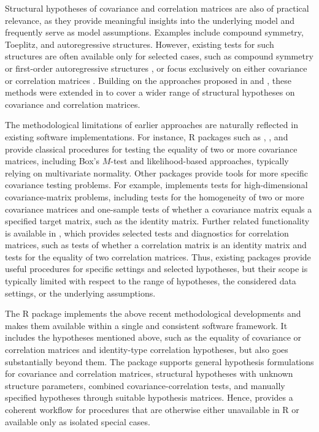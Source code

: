 Structural hypotheses of covariance and correlation matrices are also of
practical relevance, as they provide meaningful insights into the underlying
model and frequently serve as model assumptions. Examples include compound
symmetry, Toeplitz, and autoregressive structures. However, existing tests for
such structures are often available only for selected cases, such as compound
symmetry \citep{winer1991, votaw1948} or first-order
autoregressive structures \citep{mckeown1996}, or focus exclusively on
either covariance or correlation matrices \citep{steiger1980}. Building on
the approaches proposed in \citet{sattler2022} and \citet{sattler2023},
these methods were extended in \citet{sattler2024a} to cover a wider range of
structural hypotheses on covariance and correlation matrices.

The methodological limitations of earlier approaches are naturally reflected in
existing software implementations. For instance, R packages such as
, , and  provide classical
procedures for testing the equality of two or more covariance matrices,
including Box's \(M\)-test and likelihood-based approaches, typically relying on
multivariate normality. Other packages provide tools for more specific
covariance testing problems. For example, 
\citep{Barnard2018} implements tests for high-dimensional covariance-matrix
problems, including tests for the homogeneity of two or more covariance matrices
and one-sample tests of whether a covariance matrix equals a specified target
matrix, such as the identity matrix. Further related functionality is available
in  \citep{Revelle2019}, which provides selected tests and
diagnostics for correlation matrices, such as tests of whether a correlation
matrix is an identity matrix and tests for the equality of two correlation
matrices. Thus, existing packages provide useful procedures for specific
settings and selected hypotheses, but their scope is typically limited with
respect to the range of hypotheses, the considered data settings, or the
underlying assumptions.

The R package  \citep{covcortest} implements the above
recent methodological developments and makes them available within a single and
consistent software framework. It includes the hypotheses mentioned above, such
as the equality of covariance or correlation matrices and identity-type
correlation hypotheses, but also goes substantially beyond them. The package
supports general hypothesis formulations for covariance and correlation
matrices, structural hypotheses with unknown structure parameters, combined
covariance-correlation tests, and manually specified hypotheses through suitable
hypothesis matrices. Hence,  provides a coherent workflow for
procedures that are otherwise either unavailable in R or available only as
isolated special cases.

